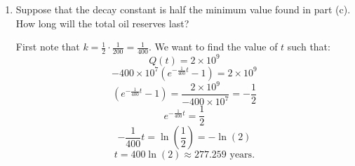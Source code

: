 \documentclass[nooutcomes]{ximera}
\begin{document}
\begin{problem}
\begin{enumerate}
		
		
	\item  Suppose that the decay constant is half the minimum value found in part (c).  
	How long will the total oil reserves last?
		\begin{freeResponse}
		First note that $k = \frac{1}{2} \cdot \frac{1}{200} = \frac{1}{400}$.  
		We want to find the value of $t$ such that:
			\begin{equation*}
			Q(t) = 2 \times 10^9
			\end{equation*}
			\begin{equation*}
			- 400 \times 10^7 \left(e^{-\frac{1}{400}t}-1 \right) = 2 \times 10^9
			\end{equation*}
			\begin{equation*}
			\left(e^{-\frac{1}{400}t}-1 \right) = \frac{2 \times 10^9}{-400 \times 10^7} = - \frac{1}{2}
			\end{equation*}
			\begin{equation*}
			e^{-\frac{1}{400}t} = \frac{1}{2}
			\end{equation*}
			\begin{equation*}
			-\frac{1}{400}t=\ln \left(\frac{1}{2} \right) = -\ln(2)
			\end{equation*}
			\begin{equation*}
			t = 400 \ln(2) \approx 277.259 \text{ years}.
			\end{equation*}
		\end{freeResponse}
		
		
		
	\end{enumerate}
		
		
		

\end{problem}



















	
	
	
	
	
	
	
	
	

	










								
				
				
	
\end{document}
